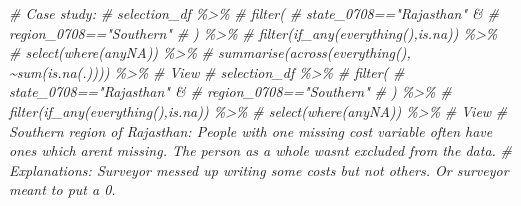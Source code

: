 \documentclass[
]{article}
\newenvironment{Shaded}{\begin{snugshade}}{\end{snugshade}}
\newcommand{\CommentTok}[1]{\textcolor[rgb]{0.56,0.35,0.01}{\textit{#1}}}
\begin{document}
\begin{Shaded}
\begin{Highlighting}[]
\CommentTok{\# Case study:}
\CommentTok{\# selection\_df \%\textgreater{}\%}
\CommentTok{\#   filter(}
\CommentTok{\#     state\_0708=="Rajasthan" \&}
\CommentTok{\#       region\_0708=="Southern"}
\CommentTok{\#     ) \%\textgreater{}\%}
\CommentTok{\#   filter(if\_any(everything(),is.na)) \%\textgreater{}\%}
\CommentTok{\#   select(where(anyNA)) \%\textgreater{}\%}
\CommentTok{\#   summarise(across(everything(), \textasciitilde{}sum(is.na(.)))) \%\textgreater{}\%}
\CommentTok{\#   View}
\CommentTok{\# selection\_df \%\textgreater{}\%}
\CommentTok{\#   filter(}
\CommentTok{\#     state\_0708=="Rajasthan" \&}
\CommentTok{\#       region\_0708=="Southern"}
\CommentTok{\#     ) \%\textgreater{}\%}
\CommentTok{\#   filter(if\_any(everything(),is.na)) \%\textgreater{}\%}
\CommentTok{\#   select(where(anyNA)) \%\textgreater{}\%}
\CommentTok{\#   View}
\CommentTok{\# Southern region of Rajasthan: People with one missing cost variable often have ones which aren\textquotesingle{}t missing. The person as a whole wasn\textquotesingle{}t excluded from the data.}
\CommentTok{\# Explanations: Surveyor messed up writing some costs but not others. Or surveyor meant to put a 0.  }


\end{Highlighting}
\end{Shaded}
\end{document}
